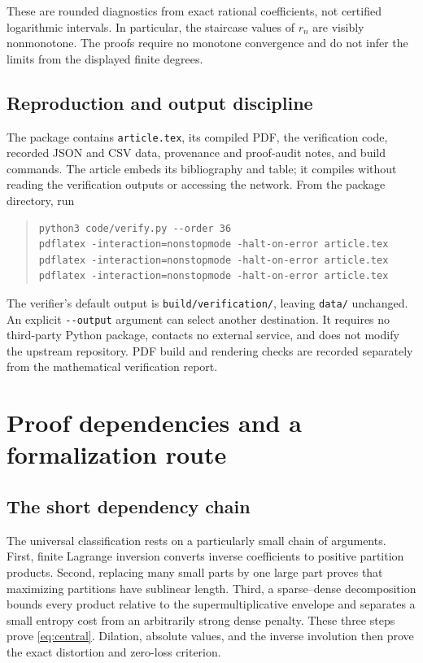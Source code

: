 \documentclass[11pt,a4paper]{article}
\numberwithin{equation}{section}
\theoremstyle{definition}
\theoremstyle{remark}
\begin{document}
These are rounded diagnostics from exact rational coefficients, not
certified logarithmic intervals. In particular, the staircase values of
$r_n$ are visibly nonmonotone. The proofs require no monotone convergence
and do not infer the limits from the displayed finite degrees.

\subsection{Reproduction and output discipline}

The package contains \texttt{article.tex}, its compiled PDF, the
verification code, recorded JSON and CSV data, provenance and proof-audit
notes, and build commands. The article embeds its bibliography and table;
it compiles without reading the verification outputs or accessing the
network. From the package directory, run
\begin{quote}\small
\begin{verbatim}
python3 code/verify.py --order 36
pdflatex -interaction=nonstopmode -halt-on-error article.tex
pdflatex -interaction=nonstopmode -halt-on-error article.tex
pdflatex -interaction=nonstopmode -halt-on-error article.tex
\end{verbatim}
\end{quote}
The verifier's default output is \texttt{build/verification/}, leaving
\texttt{data/} unchanged. An explicit \verb|--output| argument can
select another destination. It requires no third-party Python package,
contacts no external service, and does not modify the upstream repository.
PDF build and rendering checks are recorded separately from the
mathematical verification report.

\section{Proof dependencies and a formalization route}
\label{sec:formalization}

\subsection{The short dependency chain}

The universal classification rests on a particularly small chain of
arguments. First, finite Lagrange inversion converts inverse coefficients
to positive partition products. Second, replacing many small parts by
one large part proves that maximizing partitions have sublinear length.
Third, a sparse--dense decomposition bounds every product relative to
the supermultiplicative envelope and separates a small entropy cost from
an arbitrarily strong dense penalty. These three steps prove
\eqref{eq:central}. Dilation, absolute values, and the inverse involution
then prove the exact distortion and zero-loss criterion.
\end{document}
